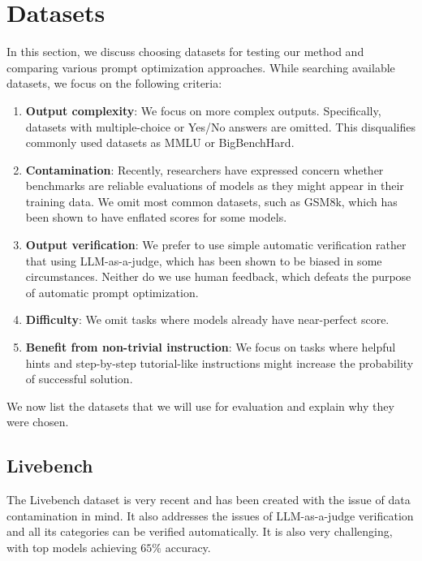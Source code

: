 \section{Datasets}
In this section, we discuss choosing datasets for testing our method and comparing various prompt optimization approaches. 
While searching available datasets, we focus on the following criteria:
\begin{enumerate}
    \item \textbf{Output complexity}: We focus on more complex outputs. Specifically, datasets with multiple-choice or Yes/No answers are omitted. 
    This disqualifies commonly used datasets as MMLU or BigBenchHard.
    \item \textbf{Contamination}: Recently, researchers have expressed concern\cite{white2025livebenchchallengingcontaminationlimitedllm} 
    whether benchmarks are reliable evaluations of models as they might appear in their training data. We omit most common datasets, such as GSM8k\cite{cobbe2021gsm8k}, which has been shown to have enflated scores for some models\cite{testing_language_models_on_a_held_out_high_school_national_finals_exam}.
    \item \textbf{Output verification}: We prefer to use simple automatic verification rather that using LLM-as-a-judge, which has been shown to be 
    biased in some circumstances\cite{ye2024justiceprejudicequantifyingbiases}. Neither do we use human feedback, which defeats the purpose of automatic prompt optimization.
    \item \textbf{Difficulty}: We omit tasks where models already have near-perfect score. 
    \item \textbf{Benefit from non-trivial instruction}: We focus on tasks where helpful hints and step-by-step tutorial-like instructions might increase the probability of successful solution.
\end{enumerate}
We now list the datasets that we will use for evaluation and explain why they were chosen.
\subsection{Livebench}
The Livebench\cite{white2025livebenchchallengingcontaminationlimitedllm} dataset is very recent and has been created with the issue of data contamination in mind.
It also addresses the issues of LLM-as-a-judge verification and all its categories can be verified automatically. It is also very challenging, with top models achieving $65\%$ accuracy\cite{white2025livebenchchallengingcontaminationlimitedllm}.


